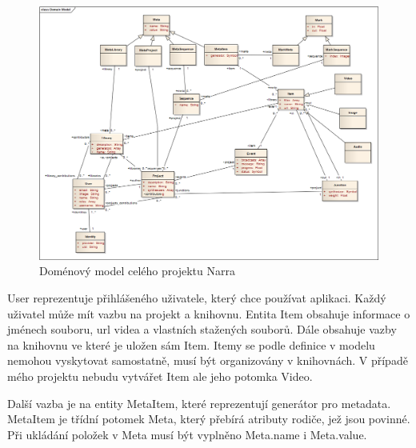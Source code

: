 \begin{figure}[H]
\includegraphics[width=1\textwidth]{./obrazova_priloha/domain_model.png}
\caption{Doménový model celého projektu Narra}
\end{figure}

\par User reprezentuje přihlášeného uživatele, který chce používat aplikaci. Každý uživatel může mít vazbu na projekt a knihovnu. Entita Item obsahuje informace o jménech souboru, url videa a vlastních stažených souborů. Dále obsahuje vazby na knihovnu ve které je uložen sám Item. Itemy se podle definice v modelu nemohou vyskytovat samostatně, musí být organizovány v knihovnách. V případě mého projektu nebudu vytvářet Item ale jeho potomka Video. 
\par Další vazba je na entity MetaItem, které reprezentují generátor pro metadata. MetaItem je třídní potomek Meta, který přebírá atributy rodiče, jež jsou povinné. Při ukládání položek v Meta musí být vyplněno Meta.name i Meta.value.

